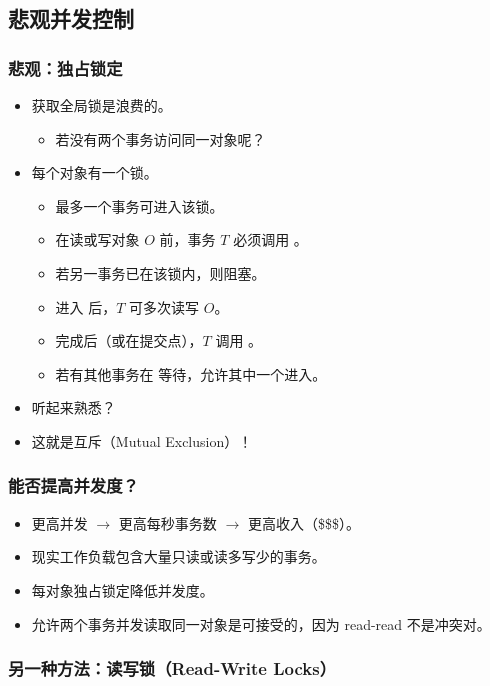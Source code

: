 \subsection{悲观并发控制}

\subsubsection{悲观：独占锁定}

\begin{itemize}
  \item 获取全局锁是浪费的。
  \begin{itemize}
    \item 若没有两个事务访问同一对象呢？
  \end{itemize}
  \item 每个对象有一个锁。
  \begin{itemize}
    \item 最多一个事务可进入该锁。
    \item 在读或写对象 $O$ 前，事务 $T$ 必须调用 。
    \item 若另一事务已在该锁内，则阻塞。
    \item 进入  后，$T$ 可多次读写 $O$。
    \item 完成后（或在提交点），$T$ 调用 。
    \item 若有其他事务在  等待，允许其中一个进入。
  \end{itemize}
  \item 听起来熟悉？
  \item 这就是互斥（Mutual Exclusion）！
\end{itemize}

\subsubsection{能否提高并发度？}

\begin{itemize}
  \item 更高并发 $\rightarrow$ 更高每秒事务数 $\rightarrow$ 更高收入（\$\$\$）。
  \item 现实工作负载包含大量只读或读多写少的事务。
  \item 每对象独占锁定降低并发度。
  \item 允许两个事务并发读取同一对象是可接受的，因为 read-read 不是冲突对。
\end{itemize}

\subsubsection{另一种方法：读写锁（Read-Write Locks）}

